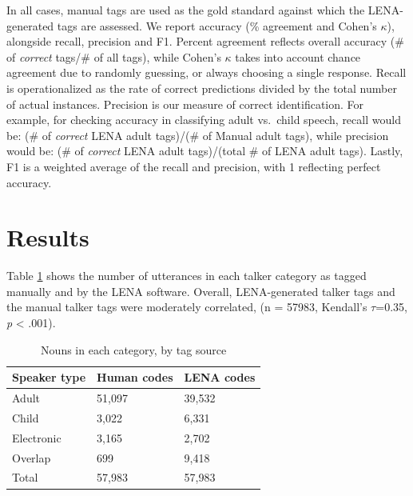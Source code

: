 \documentclass[man,floatsintext]{apa6}
\theoremstyle{definition}
\theoremstyle{definition}
\theoremstyle{definition}
\theoremstyle{remark}
\begin{document}
In all cases, manual tags are used as the gold standard against which
the LENA-generated tags are assessed. We report accuracy (\% agreement
and Cohen's \(\kappa\)), alongside recall, precision and F1. Percent
agreement reflects overall accuracy (\# of \emph{correct} tags/\# of all
tags), while Cohen's \(\kappa\) takes into account chance agreement due
to randomly guessing, or always choosing a single response. Recall is
operationalized as the rate of correct predictions divided by the total
number of actual instances. Precision is our measure of correct
identification. For example, for checking accuracy in classifying adult
vs.~child speech, recall would be: (\# of \emph{correct} LENA adult
tags)/(\# of Manual adult tags), while precision would be: (\# of
\emph{correct} LENA adult tags)/(total \# of LENA adult tags). Lastly,
F1 is a weighted average of the recall and precision, with 1 reflecting
perfect accuracy.

\hypertarget{results}{%
\section{Results}\label{results}}

Table \ref{tab:number-of-tags} shows the number of utterances in each
talker category as tagged manually and by the LENA software. Overall,
LENA-generated talker tags and the manual talker tags were moderately
correlated, (n = 57983, Kendall's \(\tau\)=0.35, \emph{p} \textless{}
.001).

\begin{table}[H]
\begin{center}
\begin{threeparttable}
\caption{\label{tab:number-of-tags}Nouns in each category, by tag source}
\small{
\begin{tabular}{lll}
\toprule
Speaker type & \multicolumn{1}{c}{Human codes} & \multicolumn{1}{c}{LENA codes}\\
\midrule
Adult & 51,097 & 39,532\\
Child & 3,022 & 6,331\\
Electronic & 3,165 & 2,702\\
Overlap & 699 & 9,418\\
Total & 57,983 & 57,983\\
\bottomrule
\end{tabular}
}
\end{threeparttable}
\end{center}
\end{table}
\end{document}
